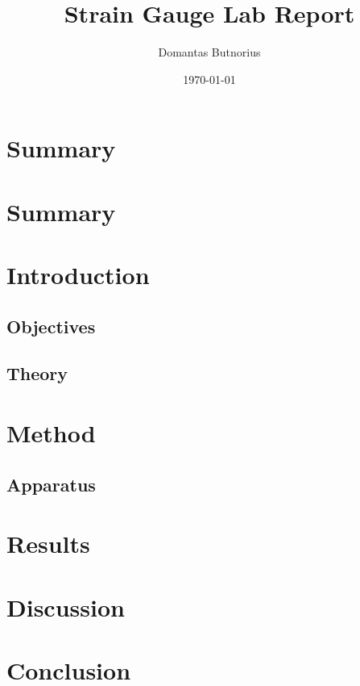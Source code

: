 \documentclass{article}
\begin{document}
\title{\textbf{Strain Gauge Lab Report}}
\author{Domantas Butnorius}
\date{\today}
\maketitle
{}
\section{Summary}
\newpage
{}
\section{Summary}
\tableofcontents
\section{Introduction}
\subsection{Objectives}
\subsection{Theory}
\section{Method}
\subsection{Apparatus}
\section{Results}
\section{Discussion}
\section{Conclusion}
\newpage
\printbibliography
\end{document}
